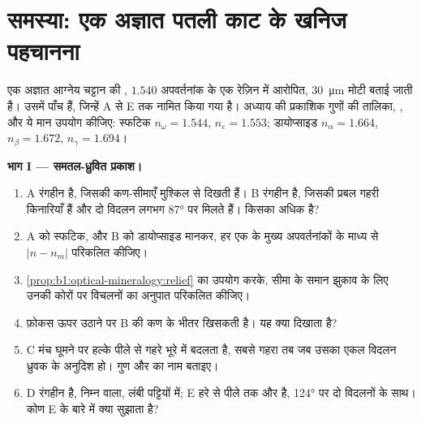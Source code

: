\section{समस्या: एक अज्ञात पतली काट के खनिज पहचानना}

\begin{problem}
\label{pb:b1:optical-mineralogy:1}
एक अज्ञात आग्नेय चट्टान की , $1.540$ अपवर्तनांक के एक रेज़िन में आरोपित, \qty{30}{\micro m} मोटी बताई जाती है।
उसमें पाँच  हैं, जिन्हें A से E तक नामित किया गया है। अध्याय की प्रकाशिक गुणों की तालिका, , और
ये मान उपयोग कीजिए: स्फटिक $n_\omega = 1.544$, $n_\varepsilon = 1.553$; डायोप्साइड $n_\alpha = 1.664$, $n_\beta = 1.672$,
$n_\gamma = 1.694$।

\medskip
\noindent\textbf{भाग I --- समतल-ध्रुवित प्रकाश।}
\begin{enumerate}
  \item {} A रंगहीन है, जिसकी कण-सीमाएँ मुश्किल से दिखती हैं।  B रंगहीन है, जिसकी प्रबल गहरी किनारियाँ हैं और दो विदलन
        लगभग \ang{87} पर मिलते हैं। किसका  अधिक है?
  \item A को स्फटिक, और B को डायोप्साइड मानकर, हर एक के मुख्य अपवर्तनांकों के माध्य से $|n - n_m|$ परिकलित कीजिए।
  \item \cref{prop:b1:optical-mineralogy:relief} का उपयोग करके, सीमा के समान झुकाव के लिए उनकी कोरों पर विचलनों का अनुपात
        परिकलित कीजिए।
  \item फ़ोकस ऊपर उठाने पर B की  कण के भीतर खिसकती है। यह क्या दिखाता है?
  \item {} C मंच घूमने पर हल्के पीले से गहरे भूरे में बदलता है, सबसे गहरा तब जब उसका एकल विदलन ध्रुवक के अनुदिश हो।
        गुण और  का नाम बताइए।
  \item {} D रंगहीन है, निम्न  वाला, लंबी पट्टियों में; E हरे से पीले तक और  है, \ang{124} पर दो विदलनों के साथ।
        कोण E के बारे में क्या सुझाता है?
\end{enumerate}


\end{problem}
